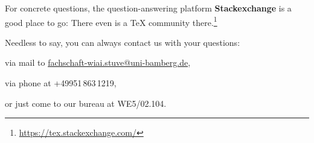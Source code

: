 For concrete questions, the question-answering platform \textbf{Stackexchange} is a good place to go: There even is a \TeX{} community there.\footnote{\url{https://tex.stackexchange.com/}}

Needless to say, you can always contact us with your questions:
\begin{compactitem}
	\item via mail to \href{mailto:fachschaft-wiai.stuve@uni-bamberg.de}{fachschaft-wiai.stuve@uni-bamberg.de},
	\item via phone at +49951\,863\,1219,
	\item or just come to our bureau at WE5/02.104.
\end{compactitem}

